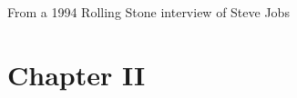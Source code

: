 \documentclass[12pt]{report}
\begin{document}
\vspace{\baselineskip}
From a 1994 Rolling Stone interview of Steve Jobs\par


\vspace{\baselineskip}

\vspace{\baselineskip}



\newpage

\vspace{\baselineskip}
\vspace{\baselineskip}
\section*{Chapter II}
\end{document}
